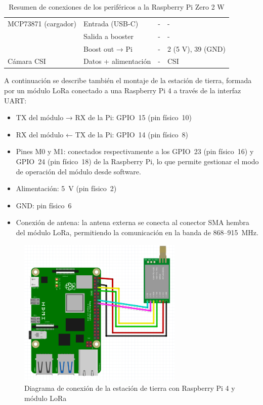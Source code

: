 \begin{table}[H]
\begin{tabular}{|l|l|l|l|}
        MCP73871 (cargador) & Entrada (USB-C)      & -             & -                   \\ \cline{2-4}
        & Salida a booster     & -             & -                   \\ \cline{2-4}
        & Boost out → Pi       & -             & 2 (5 V), 39 (GND)   \\ \hline
        Cámara CSI          & Datos + alimentación & -             & CSI                 \\ \hline
    \end{tabular}
    \caption{Resumen de conexiones de los periféricos a la Raspberry Pi Zero 2 W}
    \label{tab:resumen_conexiones}
\end{table}



A continuación se describe también el montaje de la estación de tierra, formada por un módulo LoRa conectado a una Raspberry Pi 4 a través de la interfaz UART:

\begin{itemize}
    \item TX del módulo → RX de la Pi: GPIO~15 (pin físico~10)
    \item RX del módulo ← TX de la Pi: GPIO~14 (pin físico~8)
    \item Pines M0 y M1: conectados respectivamente a los GPIO~23 (pin físico~16) y GPIO~24 (pin físico~18) de la Raspberry Pi, lo que permite gestionar el modo de operación del módulo desde software.
    \item Alimentación: 5~V (pin físico~2)
    \item GND: pin físico~6
    \item Conexión de antena: la antena externa se conecta al conector SMA hembra del módulo LoRa, permitiendo la comunicación en la banda de 868–915~MHz.

\end{itemize}

\begin{figure}[H]
    \centering
    \includegraphics[width=0.7\textwidth]{Imagenes/Bitmap/conexion_ground}
    \caption{Diagrama de conexión de la estación de tierra con Raspberry Pi 4 y módulo LoRa}
    \label{fig:conexion_ground}
\end{figure}

